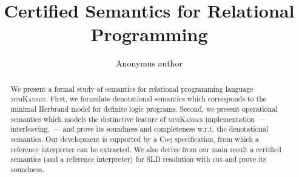 \documentclass[runningheads]{llncs}
\title{Certified Semantics for Relational Programming}
\author{Anonymus author}
\institute{Anonymus institute}
\begin{document}
\maketitle

\begin{abstract}
  We present a formal study of semantics for relational programming language \textsc{miniKanren}. First,
  we formulate denotational semantics which corresponds to the minimal Herbrand model for definite logic
  programs. Second, we present operational semantics which models the distinctive feature of \textsc{miniKanren}
  implementation~--- interleaving,~--- and prove its soundness and completeness w.r.t. the denotational semantics.
  Our development is supported by a \textsc{Coq} specification, from which a reference interpreter can be
  extracted. We also derive from our main result a certified semantics (and a reference interpreter) for SLD resolution
  with cut and prove its soundness.
\end{abstract}

















\appendix

\end{document}
